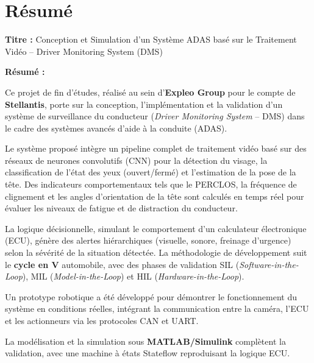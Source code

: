 
\chapter*{Résumé}

\vspace{0.5cm}

\noindent\textbf{Titre :} Conception et Simulation d'un Système ADAS basé sur le Traitement Vidéo -- Driver Monitoring System (DMS)

\vspace{0.5cm}

\noindent\textbf{Résumé :}

Ce projet de fin d'études, réalisé au sein d'\textbf{Expleo Group} pour le compte de \textbf{Stellantis}, porte sur la conception, l'implémentation et la validation d'un système de surveillance du conducteur (\textit{Driver Monitoring System} -- DMS) dans le cadre des systèmes avancés d'aide à la conduite (ADAS).

Le système proposé intègre un pipeline complet de traitement vidéo basé sur des réseaux de neurones convolutifs (CNN) pour la détection du visage, la classification de l'état des yeux (ouvert/fermé) et l'estimation de la pose de la tête. Des indicateurs comportementaux tels que le PERCLOS, la fréquence de clignement et les angles d'orientation de la tête sont calculés en temps réel pour évaluer les niveaux de fatigue et de distraction du conducteur.

La logique décisionnelle, simulant le comportement d'un calculateur électronique (ECU), génère des alertes hiérarchiques (visuelle, sonore, freinage d'urgence) selon la sévérité de la situation détectée. La méthodologie de développement suit le \textbf{cycle en V} automobile, avec des phases de validation SIL (\textit{Software-in-the-Loop}), MIL (\textit{Model-in-the-Loop}) et HIL (\textit{Hardware-in-the-Loop}).

Un prototype robotique a été développé pour démontrer le fonctionnement du système en conditions réelles, intégrant la communication entre la caméra, l'ECU et les actionneurs via les protocoles CAN et UART.

La modélisation et la simulation sous \textbf{MATLAB/Simulink} complètent la validation, avec une machine à états Stateflow reproduisant la logique ECU.

